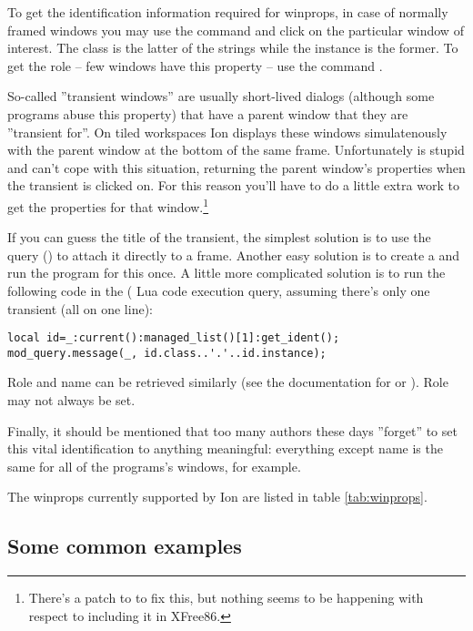 To get the identification information required for winprops, in case of
normally framed windows you may use the command  
and click on the particular window of interest. The class is the latter of
the strings while the instance is the former. To get the role -- few windows
have this property -- use the command .

So-called ''transient windows'' are usually short-lived dialogs (although
some programs abuse this property) that have a parent window that they are
''transient for''. On tiled workspaces Ion displays these windows 
simulatenously with the parent window at the bottom of the same frame.
Unfortunately  is stupid and can't cope with this situation,
returning the parent window's properties when the transient is clicked on.
For this reason you'll have to do a little extra work to get the properties
for that window.\footnote{There's a patch to  to
fix this, but nothing seems to be happening with respect to including it in 
XFree86.}

If you can guess the title of the transient, the simplest solution
is to use the  query ()
to attach it directly to a frame. Another easy solution is to create
a  and run the program for this once. A little more
complicated solution is to run the following code in the 
( Lua code execution query, assuming there's
only one transient (all on one line):

\begin{verbatim}
local id=_:current():managed_list()[1]:get_ident();
mod_query.message(_, id.class..'.'..id.instance);
\end{verbatim}

Role and name can be retrieved similarly (see the documentation for
 or ). Role may not
always be set.

Finally, it should be mentioned that too many authors these days
''forget'' to set this vital identification to anything meaningful:
everything except name is the same for all of the programs's 
windows, for example.

The winprops currently supported by Ion are listed in 
table \ref{tab:winprops}.

\subsection{Some common examples}

